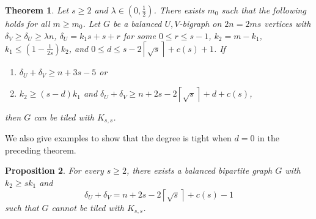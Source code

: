 \documentclass[oneside,12pt]{memoir}
\newtheorem{theorem}{Theorem}[section]
\newtheorem{proposition}[theorem]{Proposition}
\newcommand{\ceiling}[1]{\left\lceil#1\right\rceil}
\newcommand{\croot}[1]{\left\lceil\sqrt{#1}\right\rceil}
\begin{document}
\begin{theorem}\label{main 2}
Let $s\geq 2$ and $\lambda\in (0, \frac{1}{2})$.
There exists $m_0$ such that the following holds for all $m\geq m_0$.  Let $G$ be a balanced $U,V$-bigraph on $2n=2ms$ vertices with $\delta_V\geq\delta_U\geq \lambda n$, $\delta_U=k_1s+s+r$ for some $0\leq r\leq s-1$, $k_2=m-k_1$, $k_1\leq (1-\frac{1}{2s})k_2$, and $0\leq d\leq s-2\croot{s}+c(s)+1$. If
\begin{enumerate}
\item $\delta_U+\delta_V\geq n+3s-5$ or
\item $k_2\geq (s-d)k_1$ and $\delta_U+\delta_V\geq n+2s-2\croot{s}+d+c(s)$,
\end{enumerate}
then $G$ can be tiled with $K_{s,s}$.
\end{theorem}

We also give examples to show that the degree is tight when $d=0$ in the preceding theorem.

\begin{proposition}\label{k1smallexample}
For every $s\geq 2$, there exists a balanced bipartite graph $G$ with $k_2\geq sk_1$ and
$$\delta_U+\delta_V=n+2s-2\croot{s}+c(s)-1$$ such that $G$ cannot be tiled with $K_{s,s}$.  
\end{proposition}


% 
% 
% 
\end{document}

